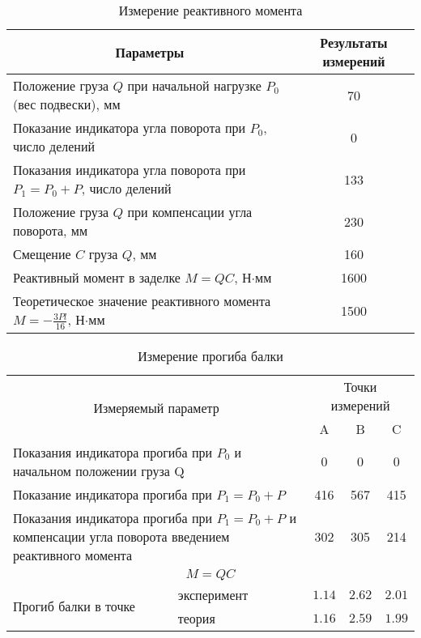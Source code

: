 \begin{table}[!ht]
    \centering
    \caption{Измерение реактивного момента}
    \label{tab:lab5-reactive-moment}
    \begin{tabular}{|m{}|c|}
        \hline
        \multicolumn{1}{|c|}{Параметры}                                                & Результаты измерений \\ \hline
        Положение груза $Q$ при начальной нагрузке $P_0$ (вес подвески), мм            & 70 \\ \hline
        Показание индикатора угла поворота при $P_0$, число делений                    & 0 \\ \hline
        Показания индикатора угла поворота при $P_1 = P_0 + P$, число делений          & 133 \\ \hline
        Положение груза $Q$ при компенсации угла поворота, мм                          & 230 \\ \hline
        Смещение $C$ груза $Q$, мм                                                     & 160 \\ \hline
        Реактивный момент в заделке $M = QC$, Н$\cdot$мм                               & 1600 \\ \hline
        Теоретическое значение реактивного момента $M = -\frac{3 P l}{16}$, Н$\cdot$мм & 1500 \\ \hline
    \end{tabular}
\end{table}

\begin{table}[!ht]
    \centering
    \caption{Измерение прогиба балки}
    \label{tab:lab5-flexure}
    \begin{tabular}{|l|l|c|c|c|}
        \hline
        \multicolumn{2}{|c|}{\multirow{2}{*}{Измеряемый параметр}} & \multicolumn{3}{c|}{Точки измерений} \\ \cline{3-5}
        \multicolumn{2}{|c|}{}                                     & A & B & C \\ \hline
        \multicolumn{2}{|m{0.45\textwidth}|}{Показания индикатора прогиба при $P_0$ и начальном положении груза Q}                                       & 0   & 0   & 0 \\ \hline
        \multicolumn{2}{|m{0.45\textwidth}|}{Показание индикатора прогиба при $P_1 = P_0 + P$}                                                           & 416 & 567 & 415 \\ \hline
        \multicolumn{2}{|m{0.45\textwidth}|}{Показания индикатора прогиба при $P_1 = P_0 + P$ и компенсации угла поворота введением реактивного момента} & 302 & 305 & 214 \\ \hline
        \multicolumn{5}{|c|}{$M = QC$} \\ \hline
        \multirow{2}{*}{Прогиб балки в точке} & эксперимент & $1.14$ & $2.62$ & $2.01$ \\ \cline{2-5}
                                              & теория      & $1.16$ & $2.59$ & $1.99$ \\ \hline
    \end{tabular}
\end{table}


